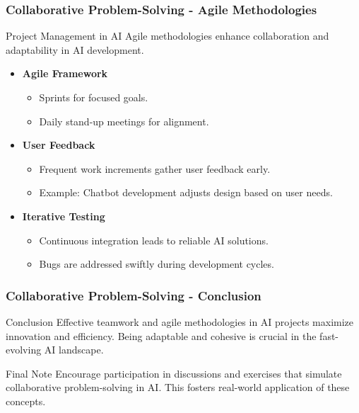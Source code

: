 \documentclass{beamer}
\begin{document}
\begin{frame}[fragile]
    \frametitle{Collaborative Problem-Solving - Agile Methodologies}
    \begin{block}{Project Management in AI}
        Agile methodologies enhance collaboration and adaptability in AI development.
    \end{block}
    
    \begin{itemize}
        \item \textbf{Agile Framework}
        \begin{itemize}
            \item Sprints for focused goals.
            \item Daily stand-up meetings for alignment.
        \end{itemize}

        \item \textbf{User Feedback}
        \begin{itemize}
            \item Frequent work increments gather user feedback early.
            \item Example: Chatbot development adjusts design based on user needs.
        \end{itemize}
        
        \item \textbf{Iterative Testing}
        \begin{itemize}
            \item Continuous integration leads to reliable AI solutions.
            \item Bugs are addressed swiftly during development cycles.
        \end{itemize}
    \end{itemize}
\end{frame}

\begin{frame}[fragile]
    \frametitle{Collaborative Problem-Solving - Conclusion}
    \begin{block}{Conclusion}
        Effective teamwork and agile methodologies in AI projects maximize innovation and efficiency.
        Being adaptable and cohesive is crucial in the fast-evolving AI landscape.
    \end{block}

    \begin{block}{Final Note}
        Encourage participation in discussions and exercises that simulate collaborative problem-solving in AI.
        This fosters real-world application of these concepts.
    \end{block}
\end{frame}
\end{document}
